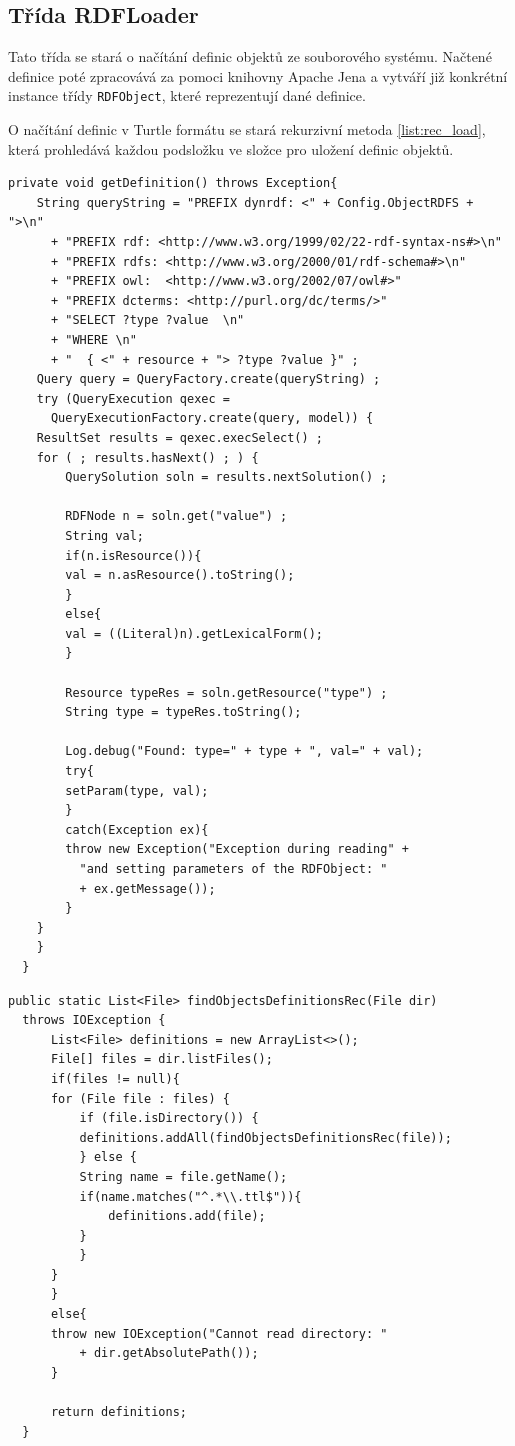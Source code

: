 \documentclass[thesis=B,czech]{FITthesis}[2012/06/26]
\begin{document}
  \subsection{Třída RDFLoader}
  Tato třída se stará o načítání definic objektů ze souborového systému. Načtené definice poté zpracovává za pomoci knihovny Apache Jena \cite{jena} 
  a vytváří již konkrétní instance třídy \texttt{RDFObject}, které reprezentují dané definice.
  
  O načítání definic v Turtle formátu se stará rekurzivní metoda \ref{list:rec_load}, která prohledává každou
  podsložku ve složce pro uložení definic objektů.   
  
        \begin{lstlisting}[float,floatplacement=H,caption={Metoda pro vytváření ekvivalentních objektů definic z Turtle souborů. Nastavení hodnot definice se 
      provádí voláním metody setParam()},label=list:get_definition]
private void getDefinition() throws Exception{
    String queryString = "PREFIX dynrdf: <" + Config.ObjectRDFS + ">\n"
      + "PREFIX rdf: <http://www.w3.org/1999/02/22-rdf-syntax-ns#>\n"
      + "PREFIX rdfs: <http://www.w3.org/2000/01/rdf-schema#>\n"
      + "PREFIX owl:  <http://www.w3.org/2002/07/owl#>"
      + "PREFIX dcterms: <http://purl.org/dc/terms/>"
      + "SELECT ?type ?value  \n"
      + "WHERE \n"
      + "  { <" + resource + "> ?type ?value }" ;
    Query query = QueryFactory.create(queryString) ;
    try (QueryExecution qexec =
      QueryExecutionFactory.create(query, model)) {
	ResultSet results = qexec.execSelect() ;
	for ( ; results.hasNext() ; ) {
	    QuerySolution soln = results.nextSolution() ;

	    RDFNode n = soln.get("value") ; 
	    String val;
	    if(n.isResource()){
		val = n.asResource().toString();
	    }
	    else{
		val = ((Literal)n).getLexicalForm();
	    }

	    Resource typeRes = soln.getResource("type") ;
	    String type = typeRes.toString();

	    Log.debug("Found: type=" + type + ", val=" + val);
	    try{
		setParam(type, val);
	    }
	    catch(Exception ex){
		throw new Exception("Exception during reading" +
		  "and setting parameters of the RDFObject: "
		  + ex.getMessage());
	    }
	}
    }
  }
\end{lstlisting}

    \begin{lstlisting}[float=htb,caption={Metoda pro načítání definic ze souborového systému},label=list:rec_load]
public static List<File> findObjectsDefinitionsRec(File dir)
  throws IOException {
      List<File> definitions = new ArrayList<>();
      File[] files = dir.listFiles();
      if(files != null){
	  for (File file : files) {
	      if (file.isDirectory()) {
		  definitions.addAll(findObjectsDefinitionsRec(file));
	      } else {
		  String name = file.getName();
		  if(name.matches("^.*\\.ttl$")){
		      definitions.add(file);
		  }
	      }
	  }
      }
      else{
	  throw new IOException("Cannot read directory: " 
	      + dir.getAbsolutePath());
      }

      return definitions;
  }
\end{lstlisting}
\end{document}
